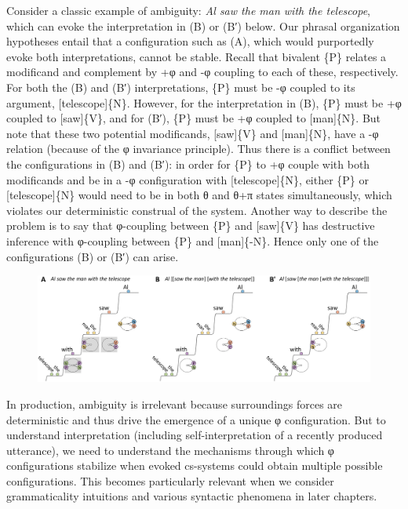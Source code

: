  Consider a classic example of ambiguity: \textit{Al saw the man with the telescope}, which can evoke the interpretation in (B) or (B′) below. Our phrasal organization hypotheses entail that a configuration such as (A), which would purportedly evoke both interpretations, cannot be stable. Recall that bivalent \{P\} relates a modificand and complement by +φ and -φ coupling to each of these, respectively. For both the (B) and (B′) interpretations, \{P\} must be -φ coupled to its argument, [telescope]\{N\}. However, for the interpretation in (B), \{P\} must be +φ coupled to [saw]\{V\}, and for (B′), \{P\} must be +φ coupled to [man]\{N\}. But note that these two potential modificands, [saw]\{V\} and [man]\{N\}, have a -φ relation (because of the φ invariance principle). Thus there is a conflict between the configurations in (B) and (B′): in order for \{P\} to +φ couple with both modificands and be in a -φ configuration with [telescope]\{N\}, either \{P\} or [telescope]\{N\} would need to be in both θ and θ+π states simultaneously, which violates our deterministic construal of the system. Another way to describe the problem is to say that φ-coupling between \{P\} and [saw]\{V\} has destructive inference with φ-coupling between \{P\} and [man]\{-N\}. Hence only one of the configurations (B) or (B′) can arise.

  
\begin{figure}
\includegraphics[width=\textwidth]{figures/Tilsen-img89.png}
\caption{\missingcaption}
\label{fig:}
\end{figure}
 

  In production, ambiguity is irrelevant because surroundings forces are deterministic and thus drive the emergence of a unique φ configuration. But to understand interpretation (including self-interpretation of a recently produced utterance), we need to understand the mechanisms through which φ configurations stabilize when evoked cs-systems could obtain multiple possible configurations. This becomes particularly relevant when we consider grammaticality intuitions and various syntactic phenomena in later chapters.

